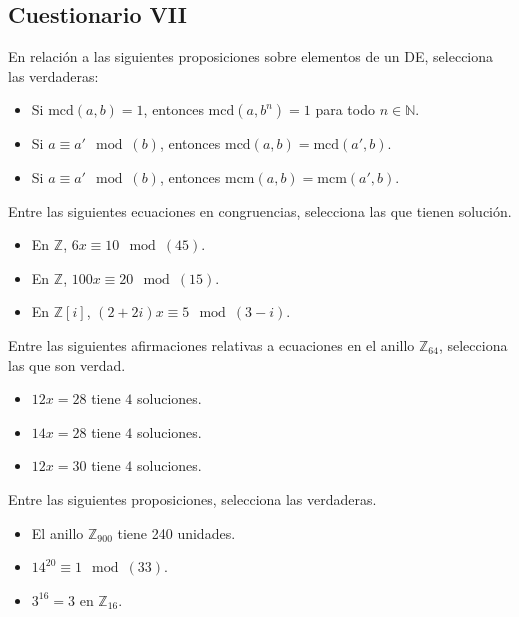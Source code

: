 \subsection{Cuestionario VII}

\begin{ejercicio}
    En relación a las siguientes proposiciones sobre elementos de un DE, selecciona las verdaderas:
    \begin{itemize}
        \item Si $\text{mcd}(a,b)=1$, entonces $\text{mcd}(a,b^n)=1$ para todo $n \in \mathbb{N}$.
        \item Si $a \equiv a'\mod(b)$, entonces $\text{mcd}(a,b)=\text{mcd}(a',b)$.
        \item Si $a\equiv a'\mod(b)$, entonces $\text{mcm}(a,b)=\text{mcm}(a',b)$.
    \end{itemize}
\end{ejercicio}

\begin{ejercicio}
    Entre las siguientes ecuaciones en congruencias, selecciona las que tienen solución.
    \begin{itemize}
        \item En $\mathbb{Z}$, $6x\equiv 10 \mod (45)$.
        \item En $\mathbb{Z}$, $100x\equiv 20\mod (15)$.
        \item En $\mathbb{Z}[i]$, $(2+2i)x\equiv 5\mod(3-i)$.
    \end{itemize}
\end{ejercicio}

\begin{ejercicio}
    Entre las siguientes afirmaciones relativas a ecuaciones en el anillo $\mathbb{Z}_{64}$, selecciona las que son verdad.
    \begin{itemize}
        \item $12x=28$ tiene $4$ soluciones.
        \item $14x=28$ tiene $4$ soluciones.
        \item $12x=30$ tiene $4$ soluciones.
    \end{itemize}
\end{ejercicio}

\begin{ejercicio}
    Entre las siguientes proposiciones, selecciona las verdaderas.
    \begin{itemize}
        \item El anillo $\mathbb{Z}_{900}$ tiene 240 unidades.
        \item $14^{20}\equiv 1\mod (33)$.
        \item $3^{16}=3$ en $\mathbb{Z}_{16}$.
    \end{itemize}
\end{ejercicio}


